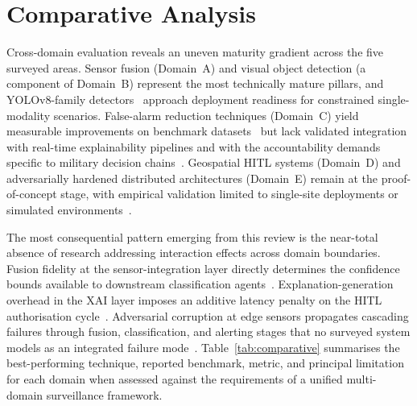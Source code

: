 \section{Comparative Analysis}
\label{sec:comparative}

Cross-domain evaluation reveals an uneven maturity gradient across the five surveyed areas. Sensor fusion (Domain~A) and visual object detection (a component of Domain~B) represent the most technically mature pillars, and YOLOv8-family detectors~\cite{satellite2024yolov8, weapon2023yolov8} approach deployment readiness for constrained single-modality scenarios. False-alarm reduction techniques (Domain~C) yield measurable improvements on benchmark datasets~\cite{deepsurvey2023anomaly} but lack validated integration with real-time explainability pipelines and with the accountability demands specific to military decision chains~\cite{military2024xai}. Geospatial HITL systems (Domain~D) and adversarially hardened distributed architectures (Domain~E) remain at the proof-of-concept stage, with empirical validation limited to single-site deployments or simulated environments~\cite{karimipour2021iot, flink2024kafka}.

The most consequential pattern emerging from this review is the near-total absence of research addressing interaction effects across domain boundaries. Fusion fidelity at the sensor-integration layer directly determines the confidence bounds available to downstream classification agents~\cite{meng2023multisource, hassan2025multiagent}. Explanation-generation overhead in the XAI layer imposes an additive latency penalty on the HITL authorisation cycle~\cite{zhang2022xai, hitl2023trust}. Adversarial corruption at edge sensors propagates cascading failures through fusion, classification, and alerting stages that no surveyed system models as an integrated failure mode~\cite{advyolo2022, milai2025risk}. Table~\ref{tab:comparative} summarises the best-performing technique, reported benchmark, metric, and principal limitation for each domain when assessed against the requirements of a unified multi-domain surveillance framework.

